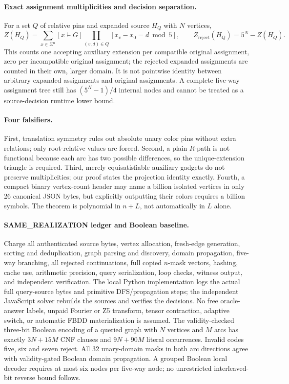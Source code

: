\documentclass[11pt]{article}
\begin{document}
\paragraph{Exact assignment multiplicities and decision separation.}
For a set $Q$ of relative pins and expanded source $H_Q$
with $N$ vertices,
\[
 Z(H_Q)=\sum_{x\in\Sigma^n}
 [x\models G]\prod_{(v,d)\in Q}
 [x_v-x_0=d\bmod5],
 \qquad
 Z_{\mathrm{reject}}(H_Q)=5^N-Z(H_Q).
\]
This counts one accepting auxiliary extension per compatible
original assignment, zero per incompatible original assignment;
the rejected expanded assignments are counted in their
own, larger domain. It is not pointwise identity
between arbitrary expanded assignments and original assignments.
A complete five-way assignment tree still has
$(5^N-1)/4$ internal nodes and cannot be treated
as a source-decision runtime lower bound.

\paragraph{Four falsifiers.}
First, translation symmetry rules out absolute unary
color pins without extra relations; only root-relative
values are forced. Second, a plain $R$-path is not
functional because each arc has two possible differences,
so the unique-extension triangle is required.
Third, merely equisatisfiable auxiliary gadgets do not
preserve multiplicities; our proof states the projection
identity exactly. Fourth, a compact binary vertex-count
header may name a billion isolated vertices in only
26 canonical JSON bytes, but explicitly outputting their
colors requires a billion symbols. The theorem is
polynomial in $n+L$, not automatically in $L$ alone.

\paragraph{SAME\_REALIZATION ledger and Boolean baseline.}
Charge all authenticated source bytes, vertex allocation,
fresh-edge generation, sorting and deduplication,
graph parsing and discovery, domain propagation,
five-way branching, all rejected continuations,
full copied $n$-mask vectors, hashing, cache use,
arithmetic precision, query serialization, loop checks,
witness output, and independent verification.
The local Python implementation logs the actual
full query-source bytes and primitive DFS/propagation steps;
the independent JavaScript solver rebuilds the sources
and verifies the decisions. No free oracle-answer labels,
unpaid Fourier or Z5 transform, tensor contraction,
adaptive switch, or automatic FBDD materialization
is assumed. The validity-checked three-bit Boolean
encoding of a queried graph with $N$ vertices and $M$
arcs has exactly $3N+15M$ CNF clauses and
$9N+90M$ literal occurrences. Invalid codes five,
six and seven reject. All 32 unary-domain masks in both
arc directions agree with validity-gated Boolean
domain propagation. A grouped Boolean local decoder
requires at most six nodes per five-way node; no
unrestricted interleaved-bit reverse bound follows.
\end{document}
